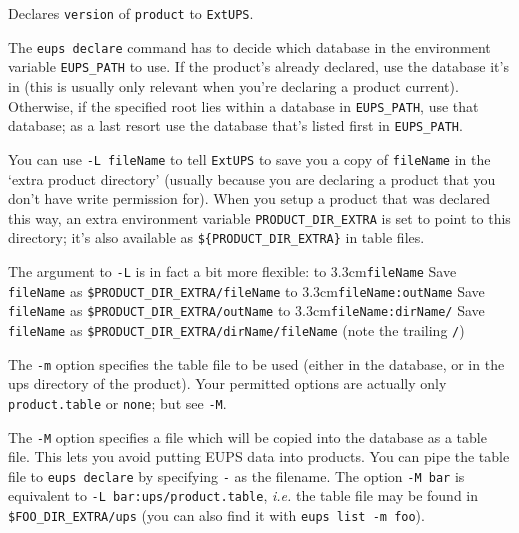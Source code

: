 \documentclass{article}
\newcommand{\code}[1]{\texttt{#1}}
\newcommand{\eups}{\code{ExtUPS}\xspace}
\begin{document}
Declares \code{version} of \code{product} to \eups.

The \code{eups declare} command has to decide which database in the environment
variable \code{EUPS\_PATH}
to use.  If the product's already declared, use the database it's in (this is usually
only relevant when you're declaring a product current).  Otherwise, if the specified root
lies within a database in \code{EUPS\_PATH}, use that database; as a last resort use
the database that's listed first in \code{EUPS\_PATH}.

You can use \code{-L fileName} to tell \eups to save you a copy of \code{fileName} in the
`extra product directory'
(usually because you are declaring a product that you don't have write permission for).
When you setup a product that was declared
this way, an extra environment variable \code{PRODUCT\_DIR\_EXTRA} is set to point to this directory;
it's also available as \code{\$\{PRODUCT\_DIR\_EXTRA\}} in table files.

The argument to \code{-L} is in fact a bit more flexible:\hfil\break
\hspace*{0.5cm}\hbox to 3.3cm{\code{fileName}\hfil}
Save \code{fileName} as \code{\$PRODUCT\_DIR\_EXTRA/fileName}\hfil\break
\hspace*{0.5cm}\hbox to 3.3cm{\code{fileName:outName}\hfil}
Save \code{fileName} as \code{\$PRODUCT\_DIR\_EXTRA/outName}\hfil\break
\hspace*{0.5cm}\hbox to 3.3cm{\code{fileName:dirName/}\hfil}
Save \code{fileName} as \code{\$PRODUCT\_DIR\_EXTRA/dirName/fileName} (note the trailing \code{/})

The \code{-m} option specifies the table
file to be used (either in the database, or in the ups directory of the product).
Your permitted options are actually only \code{product.table} or \code{none}; but see \code{-M}.

The \code{-M} option specifies a file which will be copied into the
database as a table file. This lets you avoid putting EUPS data
into products. You can pipe the table file to \code{eups declare} by
specifying \code{-} as the filename.  The option \code{-M bar} is equivalent to
\code{-L bar:ups/product.table}, \textit{i.e.} the table file may be found in \code{\$FOO\_DIR\_EXTRA/ups}
(you can also find it with \code{eups list -m foo}).
\end{document}
